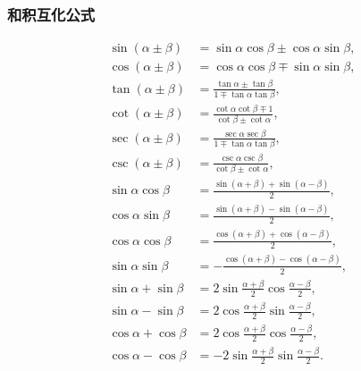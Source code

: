 \subsubsection{和积互化公式}
\begin{theorem}[和积互化公式]
\begin{align}
\sin(\alpha\pm\beta) &= \sin\alpha\cos\beta\pm\cos\alpha\sin\beta, \label{equation:函数.三角函数.和积互化公式1} \\
\cos(\alpha\pm\beta) &= \cos\alpha\cos\beta\mp\sin\alpha\sin\beta, \label{equation:函数.三角函数.和积互化公式2} \\
\tan(\alpha\pm\beta) &= \frac{\tan\alpha\pm\tan\beta}{1\mp\tan\alpha\tan\beta}, \label{equation:函数.三角函数.和积互化公式3} \\
\cot(\alpha\pm\beta) &= \frac{\cot\alpha\cot\beta\mp 1}{\cot\beta\pm\cot\alpha}, \label{equation:函数.三角函数.和积互化公式4} \\
\sec(\alpha\pm\beta) &= \frac{\sec\alpha\sec\beta}{1\mp\tan\alpha\tan\beta}, \label{equation:函数.三角函数.和积互化公式5} \\
\csc(\alpha\pm\beta) &= \frac{\csc\alpha\csc\beta}{\cot\beta\pm\cot\alpha}, \label{equation:函数.三角函数.和积互化公式6} \\
\sin \alpha \cos \beta &= \frac{\sin (\alpha + \beta) + \sin (\alpha - \beta)}{2}, \label{equation:函数.三角函数.和积互化公式7} \\
\cos \alpha \sin \beta &= \frac{\sin (\alpha + \beta) - \sin (\alpha - \beta)}{2}, \label{equation:函数.三角函数.和积互化公式8} \\
\cos \alpha \cos \beta &= \frac{\cos (\alpha + \beta) + \cos (\alpha - \beta)}{2}, \label{equation:函数.三角函数.和积互化公式9} \\
\sin \alpha \sin \beta &= -\frac{\cos (\alpha + \beta) - \cos (\alpha - \beta)}{2}, \label{equation:函数.三角函数.和积互化公式10} \\
\sin \alpha + \sin \beta &= 2 \sin \frac{\alpha + \beta}{2} \cos \frac{\alpha - \beta}{2}, \label{equation:函数.三角函数.和积互化公式11} \\
\sin \alpha - \sin \beta &= 2 \cos \frac{\alpha + \beta}{2} \sin \frac{\alpha - \beta}{2}, \label{equation:函数.三角函数.和积互化公式12} \\
\cos \alpha + \cos \beta &= 2 \cos \frac{\alpha + \beta}{2} \cos \frac{\alpha - \beta}{2}, \label{equation:函数.三角函数.和积互化公式13} \\
\cos \alpha - \cos \beta &= -2 \sin \frac{\alpha + \beta}{2} \sin \frac{\alpha - \beta}{2}. \label{equation:函数.三角函数.和积互化公式14}

\end{align}
\end{theorem}
